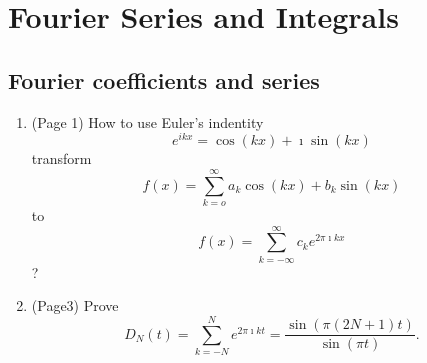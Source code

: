 \chapter{Fourier Series and Integrals}
\section{Fourier coefficients and series}

\question
\begin{enumerate}
\item {}(Page 1)
How to use Euler's indentity
\begin{equation*}
    e^{ikx}
    =
    \cos(kx)+
    \imath \sin(kx)
\end{equation*}
transform 
\begin{equation}
    f(x)
    =
    \sum_{k=o}^{\infty}
    a_k\cos (kx)
    +
    b_k \sin(kx)
\end{equation}
to 
\begin{equation}
    f(x)=
    \sum_{k=-\infty}^{\infty}
    c_k e^{2\pi \imath kx}
\end{equation}
?

\item {}(Page3)
Prove
\begin{equation*}
    D_N(t)
    =
    \sum_{k=-N}^{N}
    e^{2\pi\imath kt}
    =
    \frac{
        \sin(\pi(2N+1)t)
    }
    {
        \sin(\pi t)
    }.
\end{equation*}

\end{enumerate}


